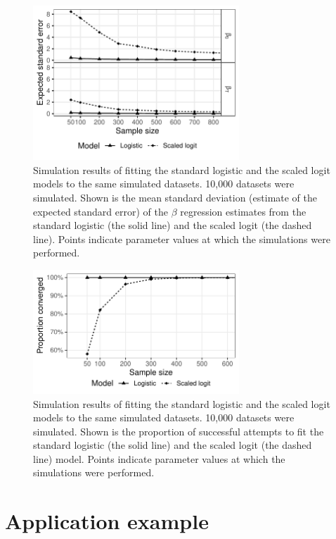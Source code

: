 \documentclass[12pt]{article}
\begin{document}
\pagebreak

\begin{figure}[htp]
	\centering
	\includegraphics[width=0.69\textwidth]{../logistic-plot/vary_nsam_se.pdf}
	\caption{
	Simulation results of fitting the standard logistic and the scaled logit models to the same simulated datasets. 10,000 datasets were simulated. Shown is the mean standard deviation (estimate of the expected standard error) of the $\beta$ regression estimates from the standard logistic (the solid line) and the scaled logit (the dashed line). Points indicate parameter values at which the simulations were performed.
	}
	\label{SclrSE}
\end{figure}

\begin{figure}[H]
	\centering
	\includegraphics[width=0.69\textwidth]{../logistic-plot/vary_nsam.pdf}
	\caption{
	Simulation results of fitting the standard logistic and the scaled logit models to the same simulated datasets. 10,000 datasets were simulated. Shown is the proportion of successful attempts to fit the standard logistic (the solid line) and the scaled logit (the dashed line) model. Points indicate parameter values at which the simulations were performed.
	}
	\label{SclrConv}
\end{figure}

\pagebreak
%
\section{Application example}
\end{document}
